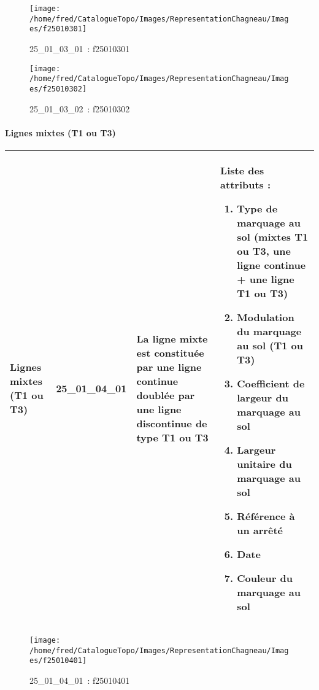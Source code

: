 \documentclass[12pt,titlepage]{book}
\begin{document}
\begin{figure}[h!]
  \hfill         %
  \begin{minipage}[t]{3cm}
    \begin{center}
      \texttt{[image: /home/fred/CatalogueTopo/Images/RepresentationChagneau/Images/f25010301]}
      \caption[~25\_01\_03\_01]{\small{25\_01\_03\_01~:} \tiny{f25010301}}\label{f25010301}
    \end{center}
  \end{minipage}
  \begin{minipage}[t]{3cm}
    \begin{center}
      \texttt{[image: /home/fred/CatalogueTopo/Images/RepresentationChagneau/Images/f25010302]}
      \caption[~25\_01\_03\_02]{\small{25\_01\_03\_02~:} \tiny{f25010302}}\label{f25010302}
    \end{center}
  \end{minipage}
\end{figure}


\paragraph{Lignes mixtes (T1 ou T3)}
\noindent
\vspace{\baselineskip}

\renewcommand{\arraystretch}{1.2}
\begin{supertabular}{|p{10cm}|c|p{13cm}|p{12cm}|}
 Lignes mixtes (T1 ou T3) & 25\_01\_04\_01 & La ligne mixte est constituée par une ligne continue doublée par une ligne discontinue de type T1 ou T3 & Liste des attributs :
\begin{enumerate}
  \item Type de marquage au sol (mixtes T1 ou T3, une ligne continue + une ligne T1 ou T3)  \item Modulation du marquage au sol (T1 ou T3)  \item Coefficient de largeur du marquage au sol  \item Largeur unitaire du marquage au sol  \item Référence à un arrêté  \item Date  \item Couleur du marquage au sol\end{enumerate}
\\
\hline
\end{supertabular}
\begin{figure}[h!]
  \hfill         %
  \begin{minipage}[t]{3cm}
    \begin{center}
      \texttt{[image: /home/fred/CatalogueTopo/Images/RepresentationChagneau/Images/f25010401]}
      \caption[~25\_01\_04\_01]{\small{25\_01\_04\_01~:} \tiny{f25010401}}\label{f25010401}
    \end{center}
  \end{minipage}
\end{figure}
\end{document}
